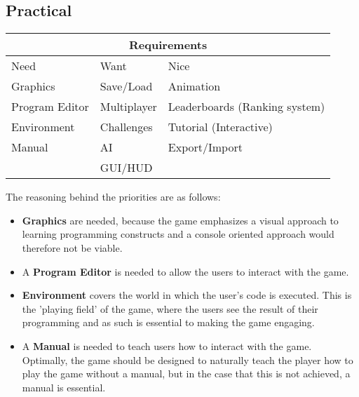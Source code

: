 \subsection*{Practical}
\begin{tabular}{|l|l|l|}
\hline
\multicolumn{3}{|c|}{Requirements}\\
\hline
Need & Want & Nice\\
\hline
Graphics & Save/Load & Animation\\
Program Editor & Multiplayer & Leaderboards (Ranking system)\\
Environment & Challenges & Tutorial (Interactive)\\
Manual & AI & Export/Import\\
 & GUI/HUD & \\
\hline
\end{tabular}\newline

The reasoning behind the priorities are as follows:

\begin{itemize}
	\item \textbf{Graphics} are needed, because the game emphasizes a visual approach to learning programming constructs and a console oriented approach would therefore not be viable.
	\item A \textbf{Program Editor} is needed to allow the users to interact with the game.
	\item \textbf{Environment} covers the world in which the user's code is executed.
	This is the 'playing field' of the game, where the users see the result of their programming and as such is essential to making the game engaging.
	\item A \textbf{Manual} is needed to teach users how to interact with the game.
	Optimally, the game should be designed to naturally teach the player how to play the game without a manual, but in the case that this is not achieved, a manual is essential.
\end{itemize}

